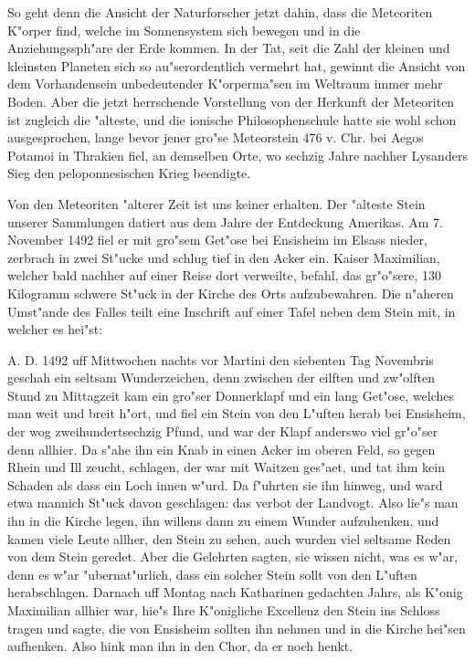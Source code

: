 \documentclass[a4paper, 11pt, oneside, german]{article}
\begin{document}
So geht denn die Ansicht der Naturforscher jetzt dahin, dass die Meteoriten K"orper find, welche im Sonnensystem sich bewegen und in die Anziehungssph"are der Erde kommen. In der Tat, seit die Zahl der kleinen und kleinsten Planeten sich so au"serordentlich vermehrt hat, gewinnt die Ansicht von dem Vorhandensein unbedeutender K"orperma"sen im Weltraum immer mehr Boden. Aber die jetzt herrschende Vorstellung von der Herkunft der Meteoriten ist zugleich die "alteste, und die ionische Philosophenschule hatte sie wohl schon ausgesprochen, lange bevor jener gro"se Meteorstein 476 v. Chr. bei Aegos Potamoi in Thrakien fiel, an demselben Orte, wo sechzig Jahre nachher Lysanders Sieg den peloponnesischen Krieg beendigte.

Von den Meteoriten "alterer Zeit ist uns keiner erhalten. Der "alteste Stein unserer Sammlungen datiert aus dem Jahre der Entdeckung Amerikas. Am 7. November 1492 fiel er mit gro"sem Get"ose bei Ensisheim im Elsass nieder, zerbrach in zwei St"ucke und schlug tief in den Acker ein. Kaiser Maximilian, welcher bald nachher auf einer Reise dort verweilte, befahl, das gr"o"sere, 130 Kilogramm schwere St"uck in der Kirche des Orts aufzubewahren. Die n"aheren Umst"ande des Falles teilt eine Inschrift auf einer Tafel neben dem Stein mit, in welcher es hei"st:

A. D. 1492 uff Mittwochen nachts vor Martini den siebenten Tag Novembris geschah ein seltsam Wunderzeichen, denn zwischen der eilften und zw"olften Stund zu Mittagzeit kam ein gro"ser Donnerklapf und ein lang Get"ose, welches man weit und breit h"ort, und fiel ein Stein von den L"uften herab bei Ensisheim, der wog zweihundertsechzig Pfund, und war der Klapf anderswo viel gr"o"ser denn allhier. Da s"ahe ihn ein Knab in einen Acker im oberen Feld, so gegen Rhein und Ill zeucht, schlagen, der war mit Waitzen ges"aet, und tat ihm kein Schaden als dass ein Loch innen w"urd. Da f"uhrten sie ihn hinweg, und ward etwa mannich St"uck davon geschlagen: das verbot der Landvogt. Also lie"s man ihn in die Kirche legen, ihn willens dann zu einem Wunder aufzuhenken, und kamen viele Leute allher, den Stein zu sehen, auch wurden viel seltsame Reden von dem Stein geredet. Aber die Gelehrten sagten, sie wissen nicht, was es w"ar, denn es w"ar "ubernat"urlich, dass ein solcher Stein sollt von den L"uften herabschlagen. Darnach uff Montag nach Katharinen gedachten Jahrs, als K"onig Maximilian allhier war, hie"s Ihre K"onigliche Excellenz den Stein ins Schloss tragen und sagte, die von Ensisheim sollten ihn nehmen und in die Kirche hei"sen aufhenken. Also hink man ihn in den Chor, da er noch henkt.
\end{document}
